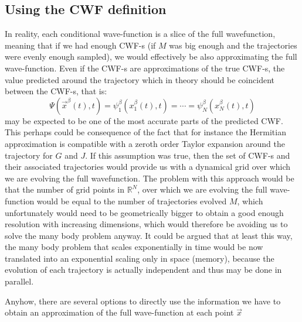 \documentclass[11pt, a4paper]{article} %
\newcommand{\R}{\mathbb{R}} %
\begin{document}
\subsection{Using the CWF definition}
In reality, each conditional wave-function is a slice of the full wavefunction, meaning that if we had enough CWF-s (if $M$ was big enough and the trajectories were evenly enough sampled), we would effectively be also approximating the full wave-function. Even if the CWF-s are approximations of the true CWF-s, the value predicted around the trajectory which in theory should be coincident between the CWF-s, that is:
$$\Psi(\vec{x}^\beta(t),t)=\psi^\beta_1(x_1^\beta (t),t)=\cdots=\psi^\beta_N(x_N^\beta (t),t)$$ 
may be expected to be one of the most accurate parts of the predicted CWF. This perhaps could be consequence of the fact that for instance the Hermitian approximation is compatible with a zeroth order Taylor expansion around the trajectory for $G$ and $J$. If this assumption was true, then the set of CWF-s and their associated trajectories would provide us with a dynamical grid over which we are evolving the full wavefunction. The problem with this approach would be that the number of grid points in $\R^N$, over which we are evolving the full wave-function would be equal to the number of trajectories evolved $M$, which unfortunately would need to be geometrically bigger to obtain a good enough resolution with increasing dimensions, which would therefore be avoiding us to solve the many body problem anyway. It could be argued that at least this way, the many body problem that scales exponentially in time would be now translated into an exponential scaling only in space (memory), because the evolution of each trajectory is actually independent and thus may be done in parallel.

Anyhow, there are several options to directly use the information we have to obtain an approximation of the full wave-function at each point $\vec{x}$
\end{document}
